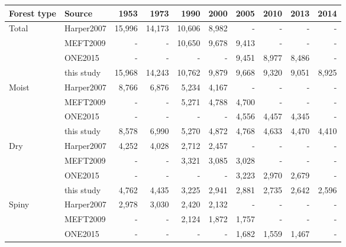 \documentclass[a4paper, 12pt, leqno]{article} %
\begin{document}
\begin{table}[!h]
  \begin{longtable}[]{@{}llrrrrrrrr@{}}
    \toprule
    Forest type & Source & 1953 & 1973 & 1990 & 2000 & 2005 & 2010 & 2013 &
    2014 \\
    \midrule
    \endhead
    Total & Harper2007 & 15,996 & 14,173 & 10,606 & 8,982 & - & - & - & - \\
          & MEFT2009 & - & - & 10,650 & 9,678 & 9,413 & - & - & - \\
                & ONE2015 & - & - & - & - & 9,451 & 8,977 & 8,486 & - \\
                & this study & 15,968 & 14,243 & 10,762 & 9,879 & 9,668 & 9,320 & 9,051
                                                                          & 8,925 \\
    Moist & Harper2007 & 8,766 & 6,876 & 5,234 & 4,167 & - & - & - &
                                                                     - \\
                & MEFT2009 & - & - & 5,271 & 4,788 & 4,700 & - & - & - \\
                & ONE2015 & - & - & - & - & 4,556 & 4,457 & 4,345 & - \\
                & this study & 8,578 & 6,990 & 5,270 & 4,872 & 4,768 & 4,633 & 4,470 &
                                                                                       4,410 \\
    Dry & Harper2007 & 4,252 & 4,028 & 2,712 & 2,457 & - & - & - &
                                                                   - \\
                & MEFT2009 & - & - & 3,321 & 3,085 & 3,028 & - & - & - \\
                & ONE2015 & - & - & - & - & 3,223 & 2,970 & 2,679 & - \\
                & this study & 4,762 & 4,435 & 3,225 & 2,941 & 2,881 & 2,735 & 2,642 &
                                                                                       2,596 \\
    Spiny & Harper2007 & 2,978 & 3,030 & 2,420 & 2,132 & - & - & - &
                                                                     - \\
                & MEFT2009 & - & - & 2,124 & 1,872 & 1,757 & - & - & - \\
                & ONE2015 & - & - & - & - & 1,682 & 1,559 & 1,467 & - \\

\end{longtable}
\end{table}
\end{document}
